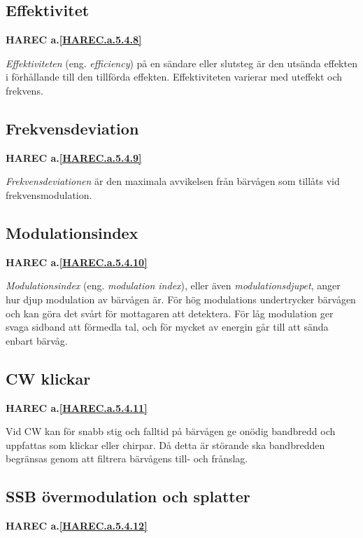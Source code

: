 \subsection{Effektivitet}
\textbf{HAREC
  a.\ref{HAREC.a.5.4.8}\label{myHAREC.a.5.4.8}
}

\emph{Effektiviteten} (eng. \emph{efficiency}) på en sändare eller slutsteg
är den utsända effekten i förhållande till den tillförda effekten.
Effektiviteten varierar med uteffekt och frekvens.

\subsection{Frekvensdeviation}
\textbf{HAREC
  a.\ref{HAREC.a.5.4.9}\label{myHAREC.a.5.4.9}
}

\emph{Frekvensdeviationen} är den maximala avvikelsen från bärvågen som
tillåts vid frekvensmodulation.

\subsection{Modulationsindex}
\textbf{HAREC
  a.\ref{HAREC.a.5.4.10}\label{myHAREC.a.5.4.10}
}

\emph{Modulationsindex} (eng. \emph{modulation index}), eller även
\emph{modulationsdjupet}, anger hur djup modulation av bärvågen är.
För hög modulations undertrycker bärvågen och kan göra det svårt för
mottagaren att detektera.
För låg modulation ger svaga sidband att förmedla tal, och för mycket
av energin går till att sända enbart bärvåg.

\subsection{CW klickar}
\textbf{HAREC
  a.\ref{HAREC.a.5.4.11}\label{myHAREC.a.5.4.11}
}

Vid CW kan för snabb stig och falltid på bärvågen ge onödig bandbredd och
uppfattas som klickar eller chirpar. Då detta är störande ska bandbredden
begränsas genom att filtrera bärvågens till- och frånslag.

\subsection{SSB övermodulation och splatter}
\textbf{HAREC
  a.\ref{HAREC.a.5.4.12}\label{myHAREC.a.5.4.12}
}

